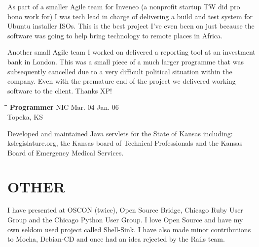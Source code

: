 \documentclass{res}
\begin{document}
\begin{resume}
    As part of a smaller Agile team for Inveneo (a nonprofit startup TW
    did pro bono work for) I was tech lead in charge of delivering 
    a build and test system for Ubuntu installer ISOs. This is the
    best project I've even been on just because the software was
    going to help bring technology to remote places in Africa.

    Another small Agile team I worked on delivered a reporting tool
    at an investment bank in London.  This was a small piece of a 
    much larger programme that was subsequently cancelled due to 
    a very difficult political situation within the company.  Even
    with the premature end of the project we delivered working software
    to the client.  Thanks XP! %

   \begin{tabbing}
   \hspace{2.3in}\= \hspace{2.6in}\= \kill %
    {\bf Programmer} \>NIC \> Mar. 04-Jan. 06\\
                          \>Topeka, KS
   \end{tabbing}\vspace{-20pt}
    Developed and maintained Java servlets for the State of Kansas
    including: kslegislature.org, the Kansas board of Technical 
    Professionals and the Kansas Board of Emergency Medical Services.

\section{OTHER}          
    I have presented at OSCON (twice), Open Source Bridge, Chicago
    Ruby User Group and the Chicago Python User Group.  I love Open 
    Source and have my own seldom used project called Shell-Sink.  
    I have also made minor contributions to Mocha, Debian-CD and 
    once had an idea rejected by the Rails team.


\end{resume}
\end{document}
